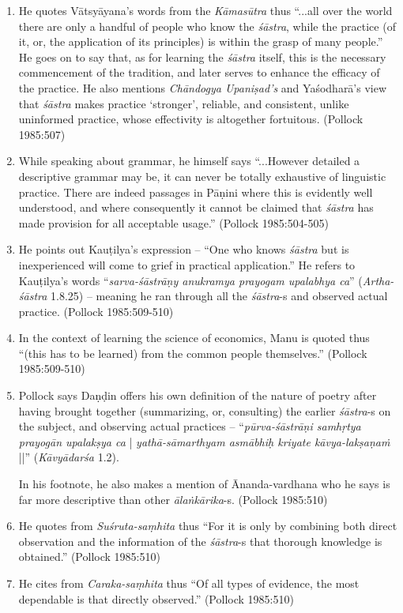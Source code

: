 \begin{enumerate}
\item He quotes Vātsyāyana's words from the {\it Kāmasūtra} thus ``...all over the world there are only a handful of people who know the {\it śāstra}, while the practice (of it, or, the application of its principles) is within the grasp of many people.'' He goes on to say that, as for learning the {\it śāstra} itself, this is the necessary commencement of the tradition, and later serves to enhance the efficacy of the practice. He also mentions \textit{Chāndogya Upaniṣad's} and Yaśodharā's view that {\it śāstra} makes practice `stronger', reliable, and consistent, unlike uninformed practice, whose effectivity is altogether fortuitous. (Pollock 1985:507)

\item While speaking about grammar, he himself says ``...However detailed a descriptive grammar may be, it can never be totally exhaustive of linguistic practice. There are indeed passages in Pāṇini where this is evidently well understood, and where consequently it cannot be claimed that {\it śāstra} has made provision for all acceptable usage.'' (Pollock 1985:504-505)

\item He points out Kauṭilya's expression -- ``One who knows {\it śāstra} but is inexperienced will come to grief in practical application.'' He refers to Kauṭilya's words ``\textit{sarva-śāstrāṇy anukramya prayogam upalabhya ca}'' (\textit{Artha-śāstra} 1.8.25) -- meaning he ran through all the {\it śāstra}-s and observed actual practice. (Pollock 1985:509-510)

\item In the context of learning the science of economics, Manu is quoted thus ``(this has to be learned) from the common people themselves.'' (Pollock 1985:509-510)

\item Pollock says Daṇḍin offers his own definition of the nature of poetry after having brought together (summarizing, or, consulting) the earlier {\it śāstra}-s on the subject, and observing actual practices -- ``\textit{pūrva-śāstrāṇi samhṛtya prayogān upalakṣya ca} | \textit{yathā-\break sāmarthyam asmābhiḥ kriyate kāvya-lakṣaṇaṁ} ||'' (\textit{Kāvyādarśa} 1.2).

In his footnote, he also makes a mention of Ānanda-vardhana who he says is far more descriptive than other {\it ālaṅkārika}-s. (Pollock 1985:510)

\item He quotes from \textit{Suśruta-saṃhita} thus ``For it is only by combining both direct observation and the information of the {\it śāstra}-s that thorough knowledge is obtained.'' (Pollock 1985:510)

\item He cites from \textit{Caraka-saṃhita} thus ``Of all types of evidence, the most dependable is that directly observed.'' (Pollock 1985:510)
\end{enumerate}

